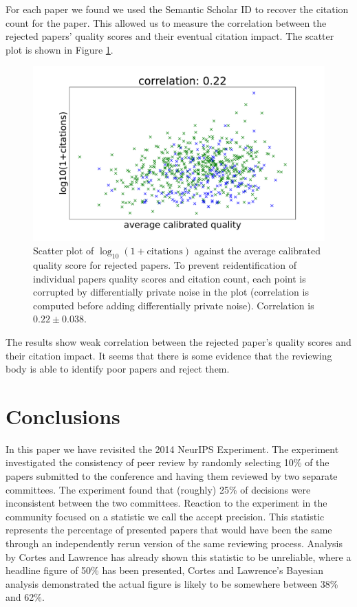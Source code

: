 \documentclass[twoside]{article}
\begin{document}
For each paper we found we used the Semantic Scholar ID to recover the citation count for the paper. This allowed us to measure the correlation between the rejected papers' quality scores and their eventual citation impact. The scatter plot is shown in Figure \ref{figure-citations-vs-average-calibrated-quality-reject}.

\begin{figure}[htb]
\begin{center}
\includegraphics[width=0.90\columnwidth]{diagrams/neurips/citations-vs-average-calibrated-quality-reject.pdf}
\end{center}
\caption{Scatter plot of $\log_{10}(1+\text{citations})$ against the average calibrated quality score for rejected papers. To prevent reidentification of individual papers quality scores and citation count, each point is corrupted by differentially private noise in the plot (correlation is computed before adding differentially private noise). Correlation is $0.22 \pm 0.038$. }
\label{figure-citations-vs-average-calibrated-quality-reject}
\end{figure}

The results show weak correlation between the rejected paper's quality scores and their citation impact. It seems that there is some evidence that the reviewing body is able to identify poor papers and reject them. 

\section{Conclusions}

In this paper we have revisited the 2014 NeurIPS Experiment. The experiment investigated the consistency of peer review by randomly selecting 10\% of the papers submitted to the conference and having them reviewed by two separate committees. The experiment found that (roughly) 25\% of decisions were inconsistent between the two committees. Reaction to the experiment in the community focused on a statistic we call the accept precision. This statistic represents the percentage of presented papers that would have been the same through an independently rerun version of the same reviewing process. Analysis by Cortes and Lawrence has already shown this statistic to be unreliable, where a headline figure of 50\% has been presented, Cortes and Lawrence's Bayesian analysis demonstrated the actual figure is likely to be somewhere between 38\% and 62\%.
\end{document}
